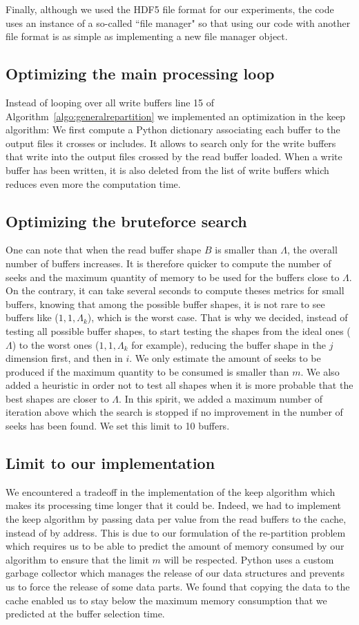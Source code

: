\documentclass[sigconf, nonacm]{acmart}
\begin{document}
Finally, although we used the HDF5 file format for our experiments, the code
uses an instance of a so-called ``file manager" so that using our code with
another file format is as simple as implementing a new file manager object.

\subsection{Optimizing the main processing loop}
Instead of looping over all write buffers line 15 of
Algorithm~\ref{algo:generalrepartition} we implemented an optimization in
the keep algorithm:
We first compute a Python dictionary associating each buffer to the output files
it crosses or includes.
It allows to search only for the write buffers that write into the output files
crossed by the read buffer loaded. When a write buffer has been written, it
is also deleted from the list of write buffers which reduces even more the
computation time.

\subsection{Optimizing the bruteforce search}
One can note that when the read buffer shape $B$ is smaller than $\Lambda$,
the overall number of buffers increases.
It is therefore quicker to compute the number of seeks and the maximum
quantity of memory to be used for the buffers close to $\Lambda$.
On the contrary, it can take several seconds to compute theses metrics for
small buffers, knowing that among the possible buffer shapes, it is not rare to
see buffers like ($1,1,\Lambda_k$), which is the worst case.
That is why we decided, instead of testing all possible buffer shapes, to start
testing the shapes from the ideal ones ($\Lambda$) to the worst ones
($1,1,\Lambda_k$ for example), reducing the buffer shape in the $j$ dimension
first, and then in $i$.
We only estimate the amount of seeks to be produced if the maximum quantity
to be consumed is smaller than $m$.
We also added a heuristic in order not to test all shapes when it is more
probable that the best shapes are closer to $\Lambda$.
In this spirit, we added a maximum number of iteration above which the search
is stopped if no improvement in the number of seeks has been found.
We set this limit to 10 buffers.

\subsection{Limit to our implementation}
We encountered a tradeoff in the implementation of the keep algorithm which
makes its processing time longer that it could be.
Indeed, we had to implement the keep algorithm by passing data per value from
the read buffers to the cache, instead of by address.
This is due to our formulation of the re-partition problem which requires us to
be able to predict the amount of memory consumed by our algorithm to ensure that
the limit $m$ will be respected.
Python uses a custom garbage collector which manages the release of our
data structures and prevents us to force the release of some data parts.
We found that copying the data to the cache enabled us to stay below the
maximum memory consumption that we predicted at the buffer selection time.
\end{document}
